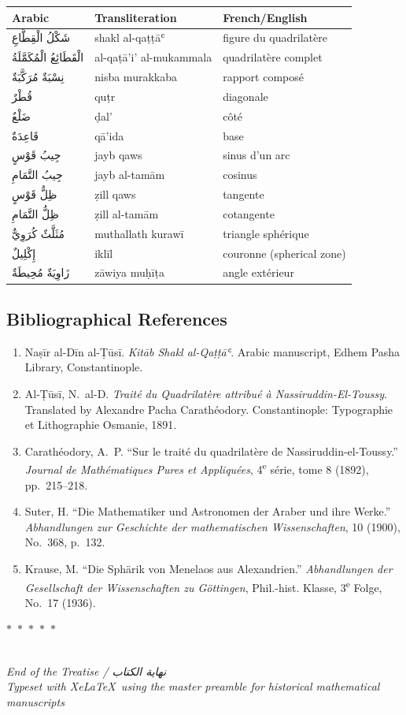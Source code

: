 \documentclass[11pt,a4paper]{article}
\theoremstyle{plain}
\theoremstyle{definition}
\theoremstyle{remark}
\newcommand{\ar}[1]{{\arabicfont\beginR #1\endR}}
\newcommand{\dblornament}{\begin{center}\textcolor{goldaccent}{$\ast$~$\ast$~$\ast$~$\ast$~$\ast$}\end{center}}
\begin{document}
\begin{center}
\begin{longtable}{lll}
\toprule
\textbf{Arabic} & \textbf{Transliteration} & \textbf{French/English} \\
\midrule
\endhead
\ar{شَكْلُ الْقِطَّاعِ} & shakl al-qaṭṭāʿ & figure du quadrilatère \\
\ar{الْقَطَائِعُ الْمُكَمَّلَةُ} & al-qaṭā'i' al-mukammala & quadrilatère complet \\
\ar{نِسْبَةٌ مُرَكَّبَةٌ} & nisba murakkaba & rapport composé \\
\ar{قُطْرٌ} & quṭr & diagonale \\
\ar{ضَلْعٌ} & ḍal' & côté \\
\ar{قَاعِدَةٌ} & qā'ida & base \\
\ar{جِيبُ قَوْسٍ} & jayb qaws & sinus d'un arc \\
\ar{جِيبُ التَّمَامِ} & jayb al-tamām & cosinus \\
\ar{ظِلُّ قَوْسٍ} & ẓill qaws & tangente \\
\ar{ظِلُّ التَّمَامِ} & ẓill al-tamām & cotangente \\
\ar{مُثَلَّثٌ كُرَوِيٌّ} & muthallath kurawī & triangle sphérique \\
\ar{إِكْلِيلٌ} & iklīl & couronne (spherical zone) \\
\ar{زَاوِيَةٌ مُحِيطَةٌ} & zāwiya muḥīṭa & angle extérieur \\
\bottomrule
\end{longtable}
\end{center}

\subsection*{Bibliographical References}

\begin{enumerate}
\item Naṣīr al-Dīn al-Ṭūsī. \textit{Kitāb Shakl al-Qaṭṭāʿ}. Arabic manuscript, Edhem Pasha Library, Constantinople.
\item Al-Ṭūsī, N.~al-D. \textit{Traité du Quadrilatère attribué à Nassiruddin-El-Toussy}. Translated by Alexandre Pacha Carathéodory. Constantinople: Typographie et Lithographie Osmanie, 1891.
\item Carathéodory, A.~P. ``Sur le traité du quadrilatère de Nassiruddin-el-Toussy.'' \textit{Journal de Mathématiques Pures et Appliquées}, 4\textsuperscript{e} série, tome 8 (1892), pp.~215--218.
\item Suter, H. ``Die Mathematiker und Astronomen der Araber und ihre Werke.'' \textit{Abhandlungen zur Geschichte der mathematischen Wissenschaften}, 10 (1900), No.~368, p.~132.
\item Krause, M. ``Die Sphärik von Menelaos aus Alexandrien.'' \textit{Abhandlungen der Gesellschaft der Wissenschaften zu Göttingen}, Phil.-hist. Klasse, 3\textsuperscript{e} Folge, No.~17 (1936).
\end{enumerate}

\vspace{1cm}
\begin{center}
\dblornament\\[0.5cm]
{\small\textit{End of the Treatise / \ar{نهاية الكتاب}}}\\[0.3cm]
{\small\textit{Typeset with XeLaTeX\ using the master preamble for historical mathematical manuscripts}}
\end{center}
\end{document}
